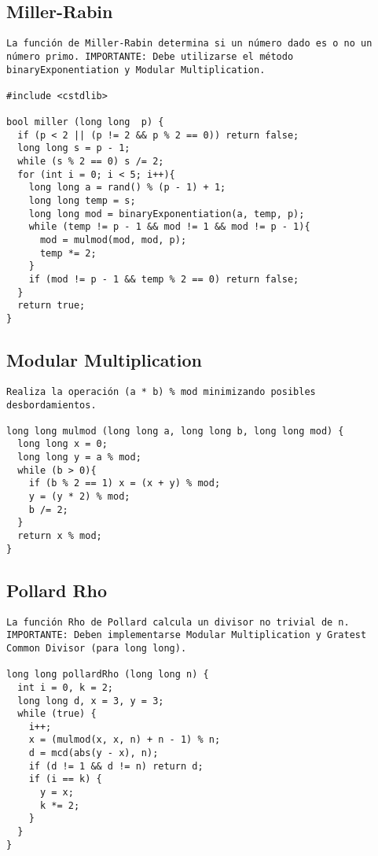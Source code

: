 \documentclass[10pt,letterpaper,twocolumn,twosided]{article}
\begin{document}
\subsection{Miller-Rabin}
\begin{lstlisting}
La función de Miller-Rabin determina si un número dado es o no un número primo. IMPORTANTE: Debe utilizarse el método binaryExponentiation y Modular Multiplication.

#include <cstdlib>

bool miller (long long  p) {
  if (p < 2 || (p != 2 && p % 2 == 0)) return false;
  long long s = p - 1;
  while (s % 2 == 0) s /= 2;
  for (int i = 0; i < 5; i++){
    long long a = rand() % (p - 1) + 1;
    long long temp = s;
    long long mod = binaryExponentiation(a, temp, p);
    while (temp != p - 1 && mod != 1 && mod != p - 1){
      mod = mulmod(mod, mod, p);
      temp *= 2;
    }
    if (mod != p - 1 && temp % 2 == 0) return false;
  }
  return true;
}\end{lstlisting}

\subsection{Modular Multiplication}
\begin{lstlisting}
Realiza la operación (a * b) % mod minimizando posibles desbordamientos.

long long mulmod (long long a, long long b, long long mod) {
  long long x = 0;
  long long y = a % mod;
  while (b > 0){
    if (b % 2 == 1) x = (x + y) % mod;
    y = (y * 2) % mod;
    b /= 2;
  }
  return x % mod;
}\end{lstlisting}

\subsection{Pollard Rho}
\begin{lstlisting}
La función Rho de Pollard calcula un divisor no trivial de n. IMPORTANTE: Deben implementarse Modular Multiplication y Gratest Common Divisor (para long long).

long long pollardRho (long long n) {
  int i = 0, k = 2;
  long long d, x = 3, y = 3;
  while (true) {
    i++;
    x = (mulmod(x, x, n) + n - 1) % n;
    d = mcd(abs(y - x), n);
    if (d != 1 && d != n) return d;
    if (i == k) {
      y = x;
      k *= 2;
    }
  }
}\end{lstlisting}
\end{document}
